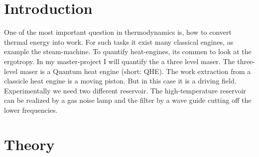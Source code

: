 \documentclass[12pt,a4paper]{article}
\begin{document}
\tableofcontents
\newpage
\section{Introduction}

One of the most important question in thermodynamics is, how to convert thermal energy into work. For such tasks it exist many classical engines, as example the steam-machine. To quantify heat-engines, its commen to look at the ergotropy. In my master-project I will quantify the a three level maser. The three-level maser is a Quantum heat engine (short: QHE).
The work extraction from a classicle heat engine is a moving piston. But in this case it is a driving field.
Experimentally we need two different reservoir. The high-temperature reservoir can be realized by a gas noise lamp and the filter by a wave guide cutting off the lower frequencies.
 

\section{Theory}
\end{document}
